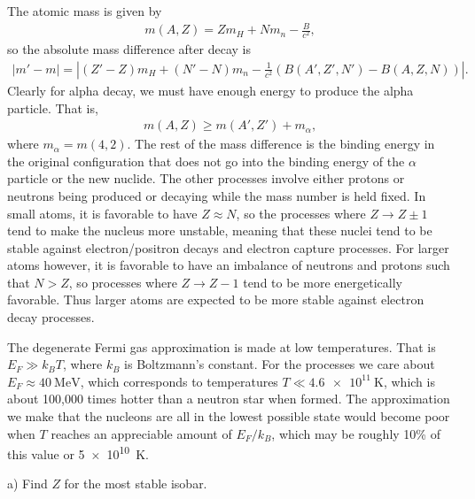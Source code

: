 The atomic mass is given by
\begin{eqnarray}
    m(A,Z) = Zm_{H} + Nm_{n} - \frac{B}{c^2}
,\end{eqnarray}
so the absolute mass difference after decay is
\begin{eqnarray}
    |m' - m| = |(Z' - Z)m_{H} + (N' - N)m_{n} - \frac{1}{c^2}(B(A',Z',N') - B(A,Z,N))|
.\end{eqnarray}
Clearly for alpha decay, we must have enough energy to produce the alpha particle.
That is,
\begin{eqnarray}
    m(A,Z) \geq m(A',Z') + m_{\alpha}
,\end{eqnarray}
where $m_{\alpha} = m(4,2)$.
The rest of the mass difference is the binding energy in the original configuration that does not go into the binding energy of the $\alpha$ particle or the new nuclide.
The other processes involve either protons or neutrons being produced or decaying while the mass number is held fixed.
In small atoms, it is favorable to have $Z \approx N$, so the processes where $Z \rightarrow Z \pm 1$ tend to make the nucleus more unstable, meaning that these nuclei tend to be stable against electron/positron decays and electron capture processes.
For larger atoms however, it is favorable to have an imbalance of neutrons and protons such that $N > Z$, so processes where $Z \rightarrow Z - 1$ tend to be more energetically favorable.
Thus larger atoms are expected to be more stable against electron decay processes. 


The degenerate Fermi gas approximation is made at low temperatures.
That is $E_{F} \gg k_{B} T$, where $k_{B}$ is Boltzmann's constant.
For the processes we care about $E_{F} \approx \SI{40}{\MeV}$, which corresponds to temperatures $T \ll \SI{4.6e11}{\K}$, which is about 100,000 times hotter than a neutron star when formed.
The approximation we make that the nucleons are all in the lowest possible state would become poor when $T$ reaches an appreciable amount of $E_{F}/k_{B}$, which may be roughly 10\% of this value or \SI{5e10}{\K}.


a) Find $Z$ for the most stable isobar.


